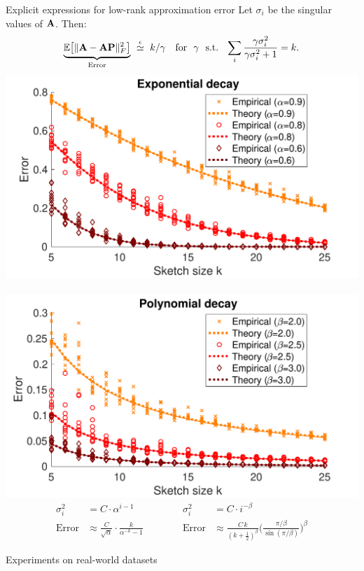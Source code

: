 \documentclass{beamer}
\begin{document}
\begin{frame}
\begin{columns}
\begin{column}{.4\textwidth}
\begin{block}{Explicit expressions for low-rank approximation error}
  Let $\sigma_i$ be the singular values of $\mathbf A$. Then:
  \begin{align*}
    \underbrace{\E\big[\|\A-\A\P\|_F^2\big]}_{\text{Error}} \ \overset\epsilon\simeq\ 
    k/\gamma
\quad \text{for \ $\gamma$ \ s.t. \ } \sum_{i}\frac{\gamma\sigma_i^2}{\gamma\sigma_i^2+1} = k.
  \end{align*}
\includegraphics[width=.495\textwidth]{../equivalents_nips/explicit_exp}~%
\nolinebreak\includegraphics[width=.495\textwidth]{../equivalents_nips/explicit_poly}
      \begin{align*}
        \sigma_i^2&=C\cdot\alpha^{i-1}
&&&&&      \sigma_i^2
        &=C\cdot i^{-\beta}
        \\
        \text{Error} & \approx
\frac C{\sqrt\alpha}\cdot
  \frac{k}{\alpha^{-k}-1}
&&&&&  
\text{Error}&\approx
\frac{C\,k}{(k+\frac12)^\beta}\bigg(\frac{\pi/\beta}{\sin(\pi/\beta)}\bigg)^\beta
      \end{align*}

    \end{block}

    \begin{block}{Experiments on real-world datasets}
      \vspace{8mm}
      

\end{block}
\end{column}
\end{columns}
\end{frame}
\end{document}
